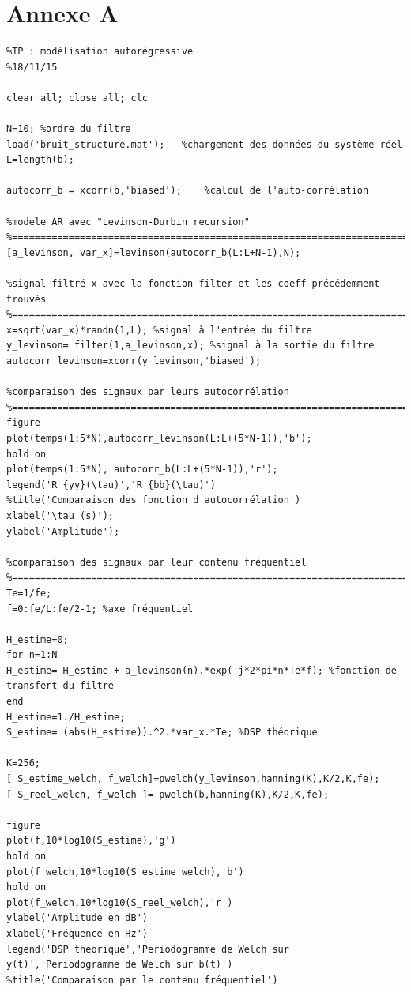\documentclass[a4paper]{article}
\begin{document}
\section*{Annexe A}
\begin{verbatim}
%TP : modélisation autorégressive
%18/11/15

clear all; close all; clc

N=10; %ordre du filtre
load('bruit_structure.mat');   %chargement des données du système réel
L=length(b);

autocorr_b = xcorr(b,'biased');    %calcul de l'auto-corrélation 

%modele AR avec "Levinson-Durbin recursion"
%==========================================================================
[a_levinson, var_x]=levinson(autocorr_b(L:L+N-1),N);

%signal filtré x avec la fonction filter et les coeff précédemment trouvés
%===========================================================================
x=sqrt(var_x)*randn(1,L); %signal à l'entrée du filtre
y_levinson= filter(1,a_levinson,x); %signal à la sortie du filtre
autocorr_levinson=xcorr(y_levinson,'biased');

%comparaison des signaux par leurs autocorrélation
%==========================================================================
figure
plot(temps(1:5*N),autocorr_levinson(L:L+(5*N-1)),'b');
hold on
plot(temps(1:5*N), autocorr_b(L:L+(5*N-1)),'r');
legend('R_{yy}(\tau)','R_{bb}(\tau)')
%title('Comparaison des fonction d autocorrélation')
xlabel('\tau (s)');
ylabel('Amplitude');

%comparaison des signaux par leur contenu fréquentiel
%===========================================================================
Te=1/fe;
f=0:fe/L:fe/2-1; %axe fréquentiel

H_estime=0;
for n=1:N
H_estime= H_estime + a_levinson(n).*exp(-j*2*pi*n*Te*f); %fonction de transfert du filtre
end
H_estime=1./H_estime;
S_estime= (abs(H_estime)).^2.*var_x.*Te; %DSP théorique

K=256;
[ S_estime_welch, f_welch]=pwelch(y_levinson,hanning(K),K/2,K,fe); 
[ S_reel_welch, f_welch ]= pwelch(b,hanning(K),K/2,K,fe);

figure
plot(f,10*log10(S_estime),'g')
hold on
plot(f_welch,10*log10(S_estime_welch),'b')
hold on
plot(f_welch,10*log10(S_reel_welch),'r')
ylabel('Amplitude en dB')
xlabel('Fréquence en Hz')
legend('DSP theorique','Periodogramme de Welch sur y(t)','Periodogramme de Welch sur b(t)')
%title('Comparaison par le contenu fréquentiel')



\end{verbatim}
\end{document}
